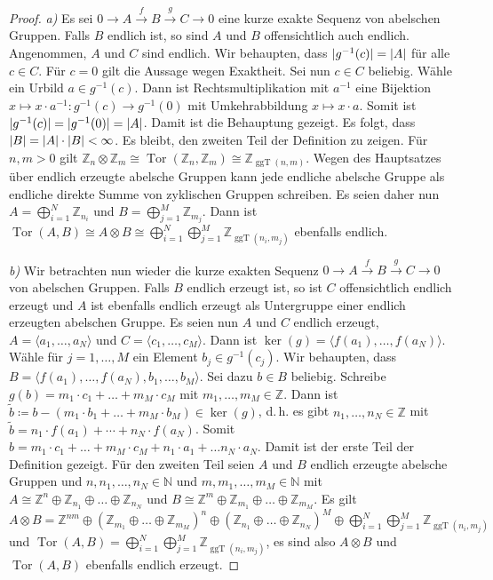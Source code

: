 \documentclass[11pt, a4paper, german]{article}
\theoremstyle{definition}
\theoremstyle{remark}
\newcommand{\N}{\mathbb{N}} %
\newcommand{\Z}{\mathbb{Z}} %
\newcommand{\angles}[1]{{\langle #1 \rangle}}
\DeclareMathOperator{\Tor}{Tor} %
\DeclarePairedDelimiter\abs{\lvert}{\rvert} %
\DeclareMathOperator{\ggT}{ggT} %
\renewcommand{\dh}{d.\,h.} %
\begin{document}
\begin{proof}
  \emph{a)} \enspace Es sei $0 \to A \xrightarrow{f} B \xrightarrow{g} C \to 0$ eine kurze exakte Sequenz von abelschen Gruppen.
  Falls $B$ endlich ist, so sind $A$ und $B$ offensichtlich auch endlich.
  Angenommen, $A$ und $C$ sind endlich.
  Wir behaupten, dass $\abs{g^{-1}(c)} = \abs{A}$ für alle $c \in C$.
  Für $c = 0$ gilt die Aussage wegen Exaktheit.
  Sei nun $c \in C$ beliebig.
  Wähle ein Urbild $a \in g^{-1}(c)$.
  Dann ist Rechtsmultiplikation mit $a^{-1}$ eine Bijektion $x \mapsto x \cdot a^{-1} : g^{-1}(c) \to g^{-1}(0)$ mit Umkehrabbildung $x \mapsto x \cdot a$.
  Somit ist $\abs{g^{-1}(c)} = \abs{g^{-1}(0)} = \abs{A}$.
  Damit ist die Behauptung gezeigt. Es folgt, dass $\abs{B} = \abs{A} \cdot \abs{B} < \infty$.
  Es bleibt, den zweiten Teil der Definition zu zeigen.
  Für $n, m > 0$ gilt $\Z_n \otimes \Z_m \cong \Tor(\Z_n, \Z_m) \cong \Z_{\ggT(n, m)}$.
  Wegen des Hauptsatzes über endlich erzeugte abelsche Gruppen kann jede endliche abelsche Gruppe als endliche direkte Summe von zyklischen Gruppen schreiben.
  Es seien daher nun $A = \bigoplus_{i=1}^N \Z_{n_i}$ und $B = \bigoplus_{j=1}^M \Z_{m_j}$.
  Dann ist $\Tor(A, B) \cong A \otimes B \cong \bigoplus_{i=1}^N \bigoplus_{j=1}^M \Z_{\ggT(n_i, m_j)}$ ebenfalls endlich.

  \emph{b)} \enspace Wir betrachten nun wieder die kurze exakten Sequenz $0 \to A \xrightarrow{f} B \xrightarrow{g} C \to 0$ von abelschen Gruppen.
  Falls $B$ endlich erzeugt ist, so ist $C$ offensichtlich endlich erzeugt und $A$ ist ebenfalls endlich erzeugt als Untergruppe einer endlich erzeugten abelschen Gruppe.
  Es seien nun $A$ und $C$ endlich erzeugt, $A = \angles{a_1, \ldots, a_N}$ und $C = \angles{c_1, \ldots, c_M}$.
  Dann ist $\ker(g) = \angles{f(a_1), \ldots, f(a_N)}$.
  Wähle für $j = 1, \ldots, M$ ein Element $b_j \in g^{-1}(c_j)$.
  Wir behaupten, dass $B = \angles{f(a_1), \ldots, f(a_N), b_1, \ldots, b_M}$.
  Sei dazu $b \in B$ beliebig.
  Schreibe $g(b) = m_1 \cdot c_1 + \ldots + m_M \cdot c_M$ mit $m_1, \ldots, m_M \in \Z$.
  Dann ist $\tilde{b} \coloneqq b - (m_1 \cdot b_1 + \ldots + m_M \cdot b_M) \in \ker(g)$, \dh{} es gibt $n_1, \ldots, n_N \in \Z$ mit $\tilde{b} = n_1 \cdot f(a_1) + \cdots + n_N \cdot f(a_N)$.
  Somit $b = m_1 \cdot c_1 + \ldots + m_M \cdot c_M + n_1 \cdot a_1 + \ldots n_N \cdot a_N$.
  Damit ist der erste Teil der Definition gezeigt.
  Für den zweiten Teil seien $A$ und $B$ endlich erzeugte abelsche Gruppen und $n, n_1, \ldots, n_N \in \N$ und $m, m_1, \ldots, m_M \in \N$ mit $A \cong \Z^n \oplus \Z_{n_1} \oplus \ldots \oplus \Z_{n_N}$ und $B \cong \Z^m \oplus \Z_{m_1} \oplus \ldots \oplus \Z_{m_M}$.
  Es gilt $A \otimes B = \Z^{nm} \oplus \left( \Z_{m_1} \oplus \ldots \oplus \Z_{m_M} \right)^n \oplus \left( \Z_{n_1} \oplus \ldots \oplus \Z_{n_N} \right)^M \oplus \bigoplus_{i=1}^N \bigoplus_{j=1}^M \Z_{\ggT(n_i, m_j)}$
  und $\Tor(A, B) = \bigoplus_{i=1}^N \bigoplus_{j=1}^M \Z_{\ggT(n_i, m_j)}$, es sind also $A \otimes B$ und $\Tor(A, B)$ ebenfalls endlich erzeugt.
\end{proof}
\end{document}
